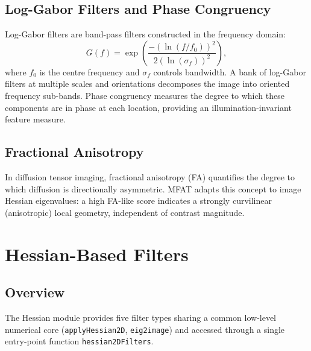 \documentclass[a4paper,justified]{tufte-book}
\begin{document}
\subsection{Log-Gabor Filters and Phase Congruency}

Log-Gabor filters are band-pass filters constructed in the frequency domain:
\begin{equation}
  G(f) = \exp\!\left(\frac{-(\ln(f/f_0))^2}{2(\ln(\sigma_f))^2}\right),
\end{equation}
where $f_0$ is the centre frequency and $\sigma_f$ controls bandwidth.
A bank of log-Gabor filters at multiple scales and orientations decomposes
the image into oriented frequency sub-bands. Phase congruency measures the
degree to which these components are in phase at each location, providing an
illumination-invariant feature measure.

\subsection{Fractional Anisotropy}

In diffusion tensor imaging, fractional anisotropy (FA) quantifies the degree
to which diffusion is directionally asymmetric. MFAT adapts this concept to
image Hessian eigenvalues: a high FA-like score indicates a strongly
curvilinear (anisotropic) local geometry, independent of contrast magnitude.

\section{Hessian-Based Filters}

\subsection{Overview}

The Hessian module provides five filter types sharing a common low-level
numerical core (\texttt{applyHessian2D}, \texttt{eig2image}) and accessed
through a single entry-point function \texttt{hessian2DFilters}.
\end{document}
